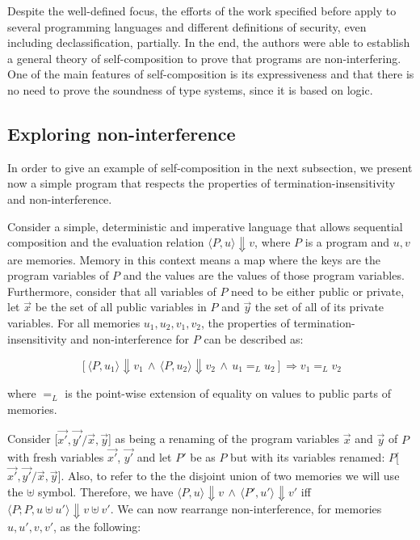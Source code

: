 Despite the well-defined focus, the efforts of the work specified before apply to several programming languages and different definitions of security, even including declassification, partially.
In the end, the authors were able to establish a general theory of self-composition to prove that programs are non-interfering.
One of the main features of self-composition is its expressiveness and that there is no need to prove the soundness of type systems, since it is based on logic.


\subsection{Exploring non-interference}
\label{subsec:exploring_non_interference}

In order to give an example of self-composition in the next subsection, we present now a simple program that respects the properties of termination-insensitivity and non-interference.

Consider a simple, deterministic and imperative language that allows sequential composition and the evaluation relation \(\langle P, u\rangle \Downarrow v\), where \(P\) is a program and \(u,v\) are memories.
Memory in this context means a map where the keys are the program variables of \(P\) and the values are the values of those program variables.
Furthermore, consider that all variables of \(P\) need to be either public or private, let \(\overrightarrow{x}\) be the set of all public variables in \(P\) and \(\overrightarrow{y}\) the set of all of its private variables.
For all memories \(u_1,u_2,v_1,v_2\), the properties of termination-insensitivity and non-interference for \(P\) can be described as:

\[ [\langle P, u_1\rangle \Downarrow v_1 \, \land \, \langle P, u_2\rangle \Downarrow v_2 \, \land \, u_1 {=}_{L} u_2] \Rightarrow v_1 {=}_{L} v_2 \]

where ${=}_{L}$ is the point-wise extension of equality on values to public parts of memories.

Consider [\(\overrightarrow{x'}, \overrightarrow{y'} / \overrightarrow{x}, \overrightarrow{y}\)] as being a renaming of the program variables \(\overrightarrow{x}\) and \(\overrightarrow{y}\) of \(P\) with fresh variables \(\overrightarrow{x'}\), \(\overrightarrow{y'}\) and let \(P'\) be as \(P\) but with its variables renamed: \(P\)[\(\overrightarrow{x'}, \overrightarrow{y'} / \overrightarrow{x}, \overrightarrow{y}\)].
Also, to refer to the the disjoint union of two memories we will use the $\uplus$ symbol.
Therefore, we have \(\langle P, u\rangle \Downarrow v \, \land \, \langle P', u'\rangle \Downarrow v' \) iff \(\langle P; P, u \uplus u' \rangle \Downarrow v \uplus v'\).
We can now rearrange non-interference, for memories \(u,u',v,v'\), as the following:

